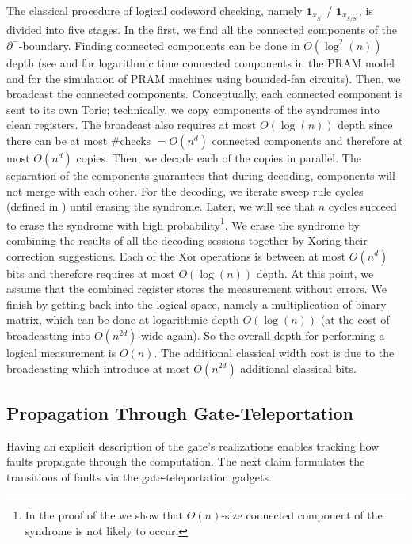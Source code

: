 The classical procedure of logical codeword checking, namely $ \mathbf{1}_{x_{S^{\prime}}}$ / $ \mathbf{1}_{x_{S/S^{\prime}}}$, is divided into five stages. In the first, we find all the connected components of the $\partial^{-}$-boundary. Finding connected components can be done in $O(\log^{2}(n))$ depth (see \cite{SHILOACH198257} and \cite{1676869} for logarithmic time connected components in the PRAM model and \cite{Lev1980} for the simulation of PRAM machines using bounded-fan circuits). Then, we broadcast the connected components. Conceptually, each connected component is sent to its own Toric; technically, we copy components of the syndromes into clean registers. The broadcast also requires at most $O(\log(n))$ depth since there can be at most \#checks $=O(n^{d})$ connected components and therefore at most $O(n^{d})$ copies. Then, we decode each of the copies in parallel. The separation of the components guarantees that during decoding, components will not merge with each other. For the decoding, we iterate sweep rule cycles (defined in ) until erasing the syndrome. Later, we will see that $n$ cycles succeed to erase the syndrome with high probability\footnote{ In the proof of the  we show that $\Theta(n)$-size connected component of the syndrome is not likely to occur.}. We erase the syndrome by combining the results of all the decoding sessions together by Xoring their correction suggestions. Each of the Xor operations is between at most $O(n^{d})$ bits and therefore requires at most $O(\log(n))$ depth. At this point, we assume that the combined register stores the measurement without errors. We finish by getting back into the logical space, namely a multiplication of binary matrix, which can be done at logarithmic depth $O(\log(n))$ (at the cost of broadcasting into $O(n^{2d})$-wide again). So the overall depth for performing a logical measurement is $O(n)$. The additional classical width cost is due to the broadcasting which introduce at most $O(n^{2d})$ additional classical bits.


\newpage

\subsection{Propagation Through Gate-Teleportation}
\label{subsection:logical_gates}
Having an explicit description of the gate's realizations enables tracking how faults propagate through the computation. The next claim formulates the transitions of faults via the gate-teleportation gadgets. 

